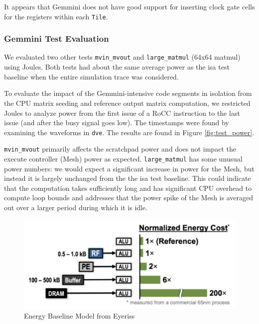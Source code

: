 \documentclass[sigconf]{acmart}
\begin{document}
It appears that Gemmini does not have good support for inserting clock gate cells for the registers within each \texttt{Tile}.

\subsubsection{Gemmini Test Evaluation}
We evaluated two other tests \texttt{mvin\_mvout} and \texttt{large\_matmul} (64x64 matmul) using Joules.
Both tests had about the same average power as the isa test baseline when the entire simulation trace was considered.

To evaluate the impact of the Gemmini-intensive code segments in isolation from the CPU matrix seeding and reference output matrix computation, we restricted Joules to analyze power from the first issue of a RoCC instruction to the last issue (and after the busy signal goes low).
The timestamps were found by examining the waveforms in \texttt{dve}.
The results are found in Figure \ref{fig:test_power}.

\texttt{mvin\_mvout} primarily affects the scratchpad power and does not impact the execute controller (Mesh) power as expected.
\texttt{large\_matmul} has some unusual power numbers: we would expect a significant increase in power for the Mesh, but instead it is largely unchanged from the the isa test baseline.
This could indicate that the computation takes sufficiently long and has significant CPU overhead to compute loop bounds and addresses that the power spike of the Mesh is averaged out over a larger period during which it is idle.

\begin{figure}
  \begin{center}
    \includegraphics[width=\linewidth]{baseline_model.pdf}
  \end{center}
  \caption{Energy Baseline Model from Eyeriss\cite{eyerissv1}}
\end{figure}
\end{document}
